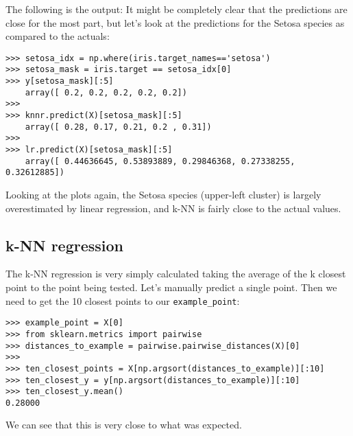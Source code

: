 \documentclass[SKL-MASTER.tex]{subfiles}
\begin{document}
The following is the output:
It might be completely clear that the predictions are close for the most part, but let's look at
the predictions for the Setosa species as compared to the actuals:
\begin{framed}
	\begin{verbatim}
>>> setosa_idx = np.where(iris.target_names=='setosa')
>>> setosa_mask = iris.target == setosa_idx[0]
>>> y[setosa_mask][:5]
    array([ 0.2, 0.2, 0.2, 0.2, 0.2])
>>>
>>> knnr.predict(X)[setosa_mask][:5]
    array([ 0.28, 0.17, 0.21, 0.2 , 0.31])
>>>
>>> lr.predict(X)[setosa_mask][:5]
    array([ 0.44636645, 0.53893889, 0.29846368, 0.27338255, 0.32612885])
\end{verbatim}
\end{framed}
Looking at the plots again, the Setosa species (upper-left cluster) is largely overestimated by
linear regression, and k-NN is fairly close to the actual values.
\subsection*{k-NN regression}
The k-NN regression is very simply calculated taking the average of the k closest point to the
point being tested.
Let's manually predict a single point. Then we need to get the 10 closest points to our \texttt{example\_point}:

\begin{framed}
	\begin{verbatim}
>>> example_point = X[0]
>>> from sklearn.metrics import pairwise
>>> distances_to_example = pairwise.pairwise_distances(X)[0]
>>>
>>> ten_closest_points = X[np.argsort(distances_to_example)][:10]
>>> ten_closest_y = y[np.argsort(distances_to_example)][:10]
>>> ten_closest_y.mean()
0.28000
\end{verbatim}
\end{framed}
We can see that this is very close to what was expected.
\end{document}
